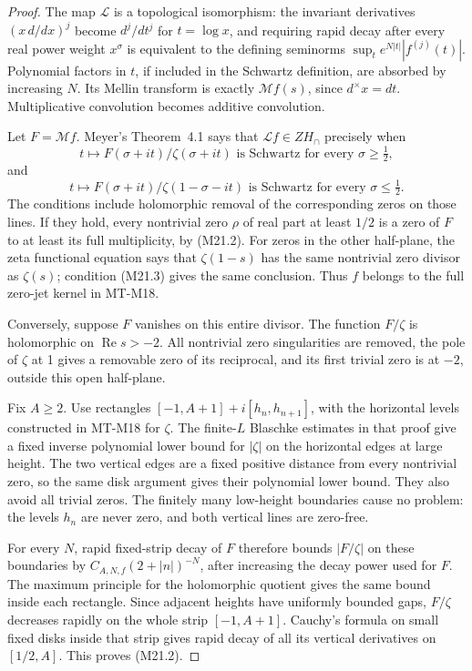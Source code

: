 \begin{proof}
The map \(\mathcal L\) is a topological isomorphism:
the invariant derivatives \((x\,d/dx)^j\) become
\(d^j/dt^j\) for \(t=\log x\), and requiring rapid
decay after every real power weight \(x^\sigma\)
is equivalent to the defining seminorms
\(\sup_t e^{N|t|}|f^{(j)}(t)|\). Polynomial factors in
\(t\), if included in the Schwartz definition, are
absorbed by increasing \(N\). Its Mellin transform is
exactly \(\mathcal Mf(s)\), since \(d^\times x=dt\).
Multiplicative convolution becomes additive convolution.

Let \(F=\mathcal Mf\). Meyer's Theorem~4.1 says that
\(\mathcal Lf\in ZH_\cap\) precisely when
\[
 t\longmapsto F(\sigma+it)/\zeta(\sigma+it)
          \text{ is Schwartz for every }\sigma\ge\tfrac12,
                                                               \tag{M21.2}
\]
and
\[
 t\longmapsto F(\sigma+it)/\zeta(1-\sigma-it)
          \text{ is Schwartz for every }\sigma\le\tfrac12.
                                                               \tag{M21.3}
\]
The conditions include holomorphic removal of the corresponding
zeros on those lines. If they hold, every nontrivial zero
\(\rho\) of real part at least \(1/2\) is a zero of \(F\)
to at least its full multiplicity, by (M21.2). For zeros in
the other half-plane, the zeta functional equation says that
\(\zeta(1-s)\) has the same nontrivial zero divisor as
\(\zeta(s)\); condition (M21.3) gives the same conclusion.
Thus \(f\) belongs to the full zero-jet kernel in MT-M18.

Conversely, suppose \(F\) vanishes on this entire divisor.
The function \(F/\zeta\) is holomorphic on
\(\operatorname{Re}s>-2\). All nontrivial zero singularities
are removed, the pole of \(\zeta\) at 1 gives a removable
zero of its reciprocal, and its first trivial zero is at
\(-2\), outside this open half-plane.

Fix \(A\ge2\). Use rectangles
\([-1,A+1]+i[h_n,h_{n+1}]\), with the horizontal levels
constructed in MT-M18 for \(\zeta\). The finite-\(L\)
Blaschke estimates in that proof give a fixed inverse
polynomial lower bound for \(|\zeta|\) on the horizontal
edges at large height. The two vertical edges are a fixed
positive distance from every nontrivial zero, so the same
disk argument gives their polynomial lower bound. They
also avoid all trivial zeros. The finitely many low-height
boundaries cause no problem: the levels \(h_n\) are never
zero, and both vertical lines are zero-free.

For every \(N\), rapid fixed-strip decay of \(F\)
therefore bounds \(|F/\zeta|\) on these boundaries by
\(C_{A,N,f}(2+|n|)^{-N}\), after increasing the decay
power used for \(F\). The maximum principle for the
holomorphic quotient gives the same bound inside each
rectangle. Since adjacent heights have uniformly bounded
gaps, \(F/\zeta\) decreases rapidly on the whole strip
\([-1,A+1]\). Cauchy's formula on small fixed disks
inside that strip gives rapid decay of all its vertical
derivatives on \([1/2,A]\). This proves (M21.2).


\end{proof}
